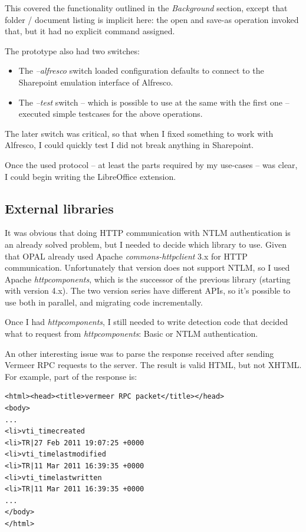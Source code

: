 This covered the functionality outlined in the \emph{Background} section,
except that folder / document listing is implicit here: the open and save-as
operation invoked that, but it had no explicit command assigned.

The prototype also had two switches:

\begin{itemize}
\item The \emph{--alfresco} switch loaded configuration defaults to connect to the Sharepoint emulation interface of Alfresco.
\item The \emph{--test} switch -- which is possible to use at the same with the first one -- executed simple testcases for the above operations.
\end{itemize}

The later switch was critical, so that when I fixed something to work with
Alfresco, I could quickly test I did not break anything in Sharepoint.

Once the used protocol -- at least the parts required by my use-cases -- was
clear, I could begin writing the LibreOffice extension.

\subsection{External libraries}

It was obvious that doing HTTP communication with NTLM authentication is an
already solved problem, but I needed to decide which library to use. Given that
OPAL already used Apache \emph{commons-httpclient}\cite{httpclient} 3.x for
HTTP communication. Unfortunately that version does not support NTLM, so I used
Apache \emph{httpcomponents}\cite{httpcomponents}, which is the successor of
the previous library (starting with version 4.x). The two version series have
different APIs, so it's possible to use both in parallel, and migrating code
incrementally.

Once I had \emph{httpcomponents}, I still needed to write detection code that
decided what to request from \emph{httpcomponents}: Basic or NTLM
authentication.

An other interesting issue was to parse the response received after sending
Vermeer RPC requests to the server. The result is valid HTML, but not XHTML.
For example, part of the response is:

\begin{lstlisting}
<html><head><title>vermeer RPC packet</title></head>
<body>
...
<li>vti_timecreated
<li>TR|27 Feb 2011 19:07:25 +0000
<li>vti_timelastmodified
<li>TR|11 Mar 2011 16:39:35 +0000
<li>vti_timelastwritten
<li>TR|11 Mar 2011 16:39:35 +0000
...
</body>
</html>\end{lstlisting}

